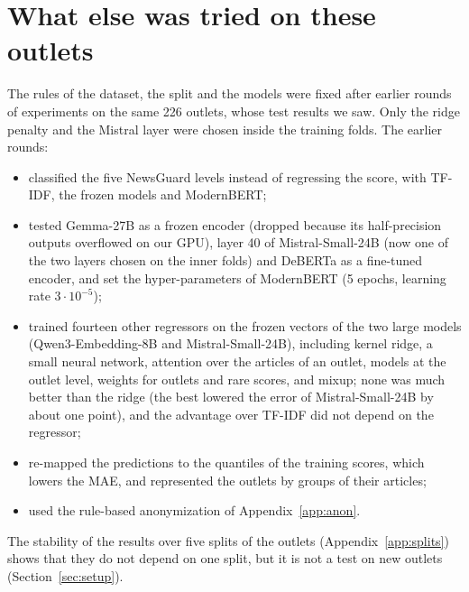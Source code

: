 \documentclass[11pt,a4paper]{article}
\begin{document}
\section{What else was tried on these outlets}\label{app:tried}
The rules of the dataset, the split and the models were fixed after earlier rounds of experiments on the same 226
outlets, whose test results we saw. Only the ridge penalty and the Mistral layer were chosen inside the training folds.
The earlier rounds:
\begin{itemize}
  \item classified the five NewsGuard levels instead of regressing the score, with TF-IDF, the frozen models and
        ModernBERT;
  \item tested Gemma-27B as a frozen encoder (dropped because its half-precision outputs overflowed on our GPU), layer 40
        of Mistral-Small-24B (now one of the two layers chosen on the inner folds) and DeBERTa as a fine-tuned encoder,
        and set the hyper-parameters of ModernBERT (5 epochs, learning rate $3 \cdot 10^{-5}$);
  \item trained fourteen other regressors on the frozen vectors of the two large models (Qwen3-Embedding-8B and
        Mistral-Small-24B), including
        kernel ridge, a small neural network, attention over the articles of an outlet, models at the outlet level,
        weights for outlets and rare scores, and mixup; none was much better than the ridge (the best lowered the error
        of Mistral-Small-24B by about one point), and the advantage over TF-IDF did not depend on the regressor;
  \item re-mapped the predictions to the quantiles of the training scores, which lowers the MAE, and represented the
        outlets by groups of their articles;
  \item used the rule-based anonymization of Appendix~\ref{app:anon}.
\end{itemize}
The stability of the results over five splits of the outlets (Appendix~\ref{app:splits}) shows that they do not depend
on one split, but it is not a test on new outlets (Section~\ref{sec:setup}).



\end{document}
